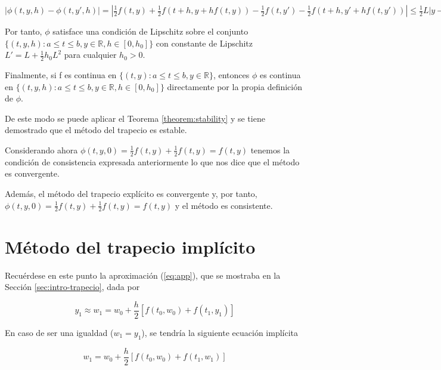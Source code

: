 \documentclass{article}
\theoremstyle{theorem-style}  %
\theoremstyle{definition-style}
\theoremstyle{example-style}
\begin{document}
		$|\phi(t,y,h)-\phi(t,y',h)|=|\frac{1}{2}f(t,y)+\frac{1}{2}f(t+h,y+hf(t,y))-\frac{1}{2}f(t,y')-\frac{1}{2}f(t+h,y'+hf(t,y'))|
		\leq
		\frac{1}{2}L|y-y'|+\frac{1}{2}L|y+hf(t,y)-y'-hf(t,y')| \leq L |y-y'|+\frac{1}{2}L|hf(t,y)-hf(t,y')|=(L+\frac{1}{2}hL^{2})|y-y'|$
	
	
		Por tanto, $\phi$ satisface una condición de Lipschitz sobre el conjunto
		$\{(t,y,h):a \leq t \leq b, y \in \mathbb{R}, h \in [0,h_0]\}$
		con constante de Lipschitz
		$L'=L+\frac{1}{2} h_0 L^{2}$
		para cualquier $h_0 > 0$.
	
	    Finalmente, si f es continua en $\{(t,y):a \leq t \leq b, y \in \mathbb{R}\}$, entonces $\phi$ es continua en  $\{(t,y,h):a \leq t \leq b, y \in \mathbb{R}, h \in [0,h_0]\}$ directamente por la propia definición de $\phi$.
	
		De este modo se puede aplicar el Teorema \ref{theorem:stability} y se tiene demostrado que el método del trapecio es estable.
	
		Considerando ahora $\phi(t,y,0)=\frac{1}{2}f(t,y)+\frac{1}{2}f(t,y)=f(t,y)$ tenemos la condición de consistencia expresada anteriormente lo que nos dice que el método es convergente.
	
	    Además, el método del trapecio explícito es convergente y, por tanto,  $\phi(t,y,0)=\frac{1}{2}f(t,y)+\frac{1}{2}f(t,y)=f(t,y)$ y el método es consistente.


\section{Método del trapecio implícito} \label{sec:trapecio-iterativo}

	Recuérdese en este punto la aproximación (\ref{eq:app}), que se mostraba en la Sección \ref{sec:intro-trapecio}, dada por

	\begin{equation*}
		y_1 \approx w_1 = w_0 + \frac{h}{2} \left[f(t_0,w_0) + f(t_1, y_1)\right]
	\end{equation*}

	En caso de ser una igualdad ($w_1 = y_1$), se tendría la siguiente ecuación implícita

	\begin{equation*}
		w_1 = w_0 + \frac{h}{2} \left[f(t_0,w_0) + f(t_1, w_1)\right]
	\end{equation*}
\end{document}
